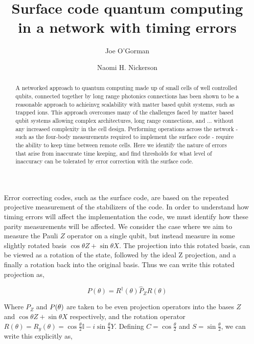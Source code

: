 \documentclass[prl, twocolumn, ,superscriptaddress]{revtex4-1}
\begin{document}
\title{Surface code quantum computing in a network with timing errors}

\author{Joe O'Gorman}
\author{Naomi H. Nickerson}


\begin{abstract}
A networked approach to quantum computing made up of small cells of well controlled qubits, 
connected together by long range photonics connections has been shown to be a reasonable 
approach to achieinvg scalability with matter based qubit systems, such as trapped ions.  
This approach overcomes many of the challenges faced by matter based qubit systems allowing
 complex architectures, long range connections, and ... without any increased complexity in the
  cell design. Performing operations across the network - such as the four-body measurements
   required to implement the surface code - require the ability to keep time between remote cells. 
   Here we identify the nature of errors that arise from inaccurate time keeping, and find thresholds
    for what level of inaccuracy can be tolerated by error correction with the surface code. 
\end{abstract}

\maketitle


Error correcting codes, such as the surface code, are based on the repeated projective measurement 
of the stabilizers of the code. In order to understand how timing errors will affect the implementation the code, 
we must identify how these parity measurements will be affected. We consider the case where we aim to 
measure the Pauli $Z$ operator on a single qubit, but instead measure in some slightly rotated basis 
$\cos\theta Z+\sin\theta X$. The projection into this rotated basis, can be viewed as a rotation
of the state, followed by the ideal Z projection, and a finally a rotation back into the original basis. 
Thus we can write this rotated projection as,

\[
P\left(\theta\right)=R^{\dagger}\left(\theta\right)\hat{P}_{Z}R\left(\theta\right)\]


Where $P_{Z}$ and $P\mbox{\ensuremath{\left(\theta\right)}}$ are
taken to be even projection operators into the bases $Z$ and $\cos\theta Z+\sin\theta X$ respectively, and 
the rotation operator $R\left(\theta\right)=R_{y}\left(\theta\right)=\cos\frac{\theta}{2}\mathbb{I}-i\sin\frac{\theta}{2}Y$.
Defining $C=\cos\frac{\theta}{2}$ and $S=\sin\frac{\theta}{2}$, we can write this explicitly as,
\end{document}
